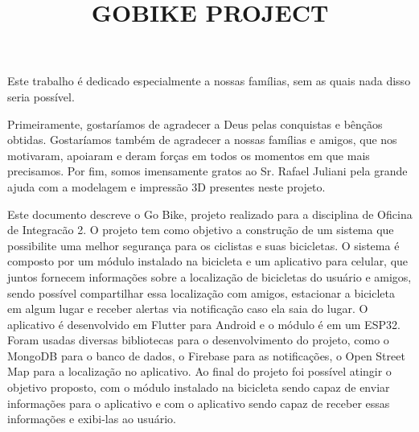 \documentclass[openright]{normas-utf-tex} %
\title{\MakeUppercase{GoBike Project}} %
\begin{document}
\capa %
\folhaderosto %


\begin{dedicatoria}
Este trabalho é dedicado especialmente a nossas famílias, sem as quais nada disso seria possível.

\end{dedicatoria}

\begin{agradecimentos}
Primeiramente, gostaríamos de agradecer a Deus pelas conquistas e bênçãos obtidas. Gostaríamos também de agradecer a nossas famílias e amigos, que nos motivaram, apoiaram e deram forças em todos os momentos em que mais precisamos. Por fim, somos imensamente gratos ao Sr. Rafael Juliani pela grande ajuda com a modelagem e impressão 3D presentes neste projeto.

 \end{agradecimentos}


\begin{resumo}
Este documento descreve o Go Bike, projeto realizado para a disciplina de Oficina de Integracão 2. O projeto tem como objetivo a construção de um sistema que possibilite uma melhor segurança para os ciclistas e suas bicicletas. O sistema é composto por um módulo instalado na bicicleta e um aplicativo para celular, que juntos fornecem informações sobre a localização de bicicletas do usuário e amigos, sendo possível compartilhar essa localização com amigos, estacionar a bicicleta em algum lugar e receber alertas via notificação caso ela saia do lugar. O aplicativo é desenvolvido em Flutter para Android e o módulo é em um ESP32. Foram usadas diversas bibliotecas para o desenvolvimento do projeto, como o MongoDB para o banco de dados, o Firebase para as notificações, o Open Street Map para a localização no aplicativo. Ao final do projeto foi possível atingir o objetivo proposto, com o módulo instalado na bicicleta sendo capaz de enviar informações para o aplicativo e com o aplicativo sendo capaz de receber essas informações e exibi-las ao usuário.
\end{resumo}
\end{document}
